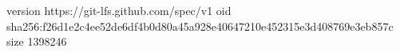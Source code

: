 version https://git-lfs.github.com/spec/v1
oid sha256:f26d1e2c4ee52de6df4b0d80a45a928e40647210e452315e3d408769e3eb857c
size 1398246
